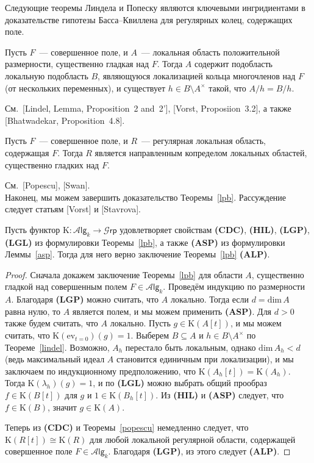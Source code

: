 \documentclass[12pt,a4paper]{article}
\begin{document}
Следующие теоремы Линдела и Попеску являются ключевыми ингридиентами в доказательстве гипотезы Басса--Квиллена для регулярных колец, содержащих поле. 
\begin{theorem}[Lindel]
\label{lindel}
Пусть $F$~--- совершенное поле, и $A$~--- локальная область положительной размерности, существенно гладкая над $F$. Тогда $A$ содержит подобласть локальную подобласть $B$, являющуюся локализацией кольца многочленов над $F$ {\rm(}от нескольких переменных{\rm)}, и существует $h\in B\setminus A^\times$ такой, что $A/h=B/h$. 
\end{theorem}
См.~[Lindel, Lemma, Proposition~2 and~2'], [Vorst, Proposiion~3.2], а также [Bhatwadekar, Proposition~4.8].

\begin{theorem}[Popescu]
\label{popescu}
Пусть $F$~--- совершенное поле, и $R$~--- регулярная локальная область, содержащая $F$. Тогда $R$ является направленным копределом локальных областей, существенно гладких над $F$.
\end{theorem}
См.~[Popescu], [Swan].\\

Наконец, мы можем завершить доказательство Теоремы~\ref{lpb}. Рассуждение следует статьям [Vorst] и [Stavrova].

\begin{lemma}
Пусть функтор $\mathrm K\colon\mathcal A\mathsf{lg}_k\rightarrow\mathcal G\mathsf{rp}$ удовлетворяет свойствам {\bf(CDC)}, {\bf(HIL)}, {\bf(LGP)}, {\bf(LGL)} из формулировки Теоремы~\ref{lpb}, а также {\bf(ASP)} из формулировки Леммы~\ref{asp}. Тогда для него верно заключение Теоремы~\ref{lpb} {\bf(ALP)}. 
\end{lemma}
\begin{proof}
Сначала докажем заключение Теоремы~\ref{lpb} для области $A$, существенно гладкой над совершенным полем $F\in\mathcal A\mathsf{lg}_k$. Проведём индукцию по размерности $A$. Благодаря {\bf(LGP)} можно считать, что $A$ локально. Тогда если $d=\mathrm{dim}\,A$ равна нулю, то $A$ является полем, и мы можем применить {\bf(ASP)}. Для $d>0$ также будем считать, что $A$ локально. Пусть $g\in\mathrm K(A[t])$, и мы можем считать, что $\mathrm K(\mathrm{ev}_{t=0})(g)=1$. Выберем $B\subseteq A$ и $h\in B\setminus A^\times$ по Теореме~\ref{lindel}. Возможно, $A_h$ перестало быть локальным, однако $\mathrm{dim}\,A_h<d$ (ведь максимальный идеал $A$ становится единичным при локализации), и мы заключаем по индукционному предположению, что $\mathrm K(A_h[t])=\mathrm K(A_h)$. Тогда $\mathrm K(\lambda_h)(g)=1$, и по {\bf(LGL)} можно выбрать общий прообраз $f\in\mathrm K(B[t])$ для $g$ и $1\in\mathrm K(B_h[t])$. Из {\bf(HIL)} и {\bf(ASP)} следует, что $f\in\mathrm K(B)$, значит $g\in\mathrm K(A)$.

Теперь из {\bf(CDC)} и Теоремы~\ref{popescu} немедленно следует, что $\mathrm K(R[t])\cong\mathrm K(R)$ для любой локальной регулярной области, содержащей совершенное поле $F\in\mathcal A\mathsf{lg}_k$. Благодаря {\bf(LGP)}, из этого следует {\bf(ALP)}.
\end{proof}
\end{document}

